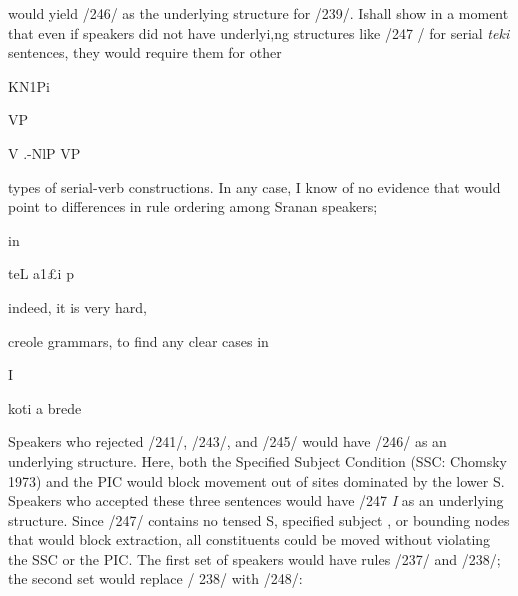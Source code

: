 \z


\ea\label{ex:247}

\z

would yield /246/ as the underlying structure for /239/. Ishall show in a moment that even if speakers did not have underlyi,ng structures like /247 / for serial \textit{teki} sentences, they would require them for other

\ea
KN1Pi

VP

V .{}-NlP VP
\z

types of serial-verb constructions. In any case, I know of no evidence that would point to differences in rule ordering among Sranan speakers;

in

teL a1£i p

indeed, it is very hard,

creole grammars, to find any clear cases in

I 

koti a brede

Speakers who rejected /241/, /243/, and /245/ would have
/246/ as an underlying structure. Here, both the Specified Subject Condition (SSC: Chomsky 1973) and the PIC would block movement out of sites dominated by the lower S. Speakers who accepted these three sentences would have /247 \textit{I} as an underlying structure. Since
/247/ contains no tensed S, specified subject , or bounding nodes that would block extraction, all constituents could be moved without violating the SSC or the PIC. The first set of speakers would have rules
/237/ and /238/; the second set would replace / 238/ with /248/:

